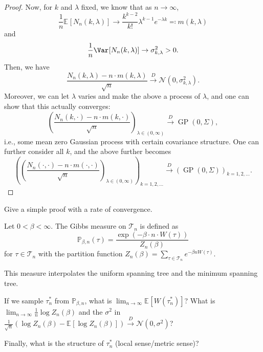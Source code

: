 \begin{proof}
	Now, for \(k\) and \(\lambda \) fixed, we know that as \(n \to \infty \),
	\[
		\frac{1}{n}\mathbb{E}_{}[N_n(k, \lambda )]
		\to \frac{k^{k-2}}{k!} \lambda ^{k-1} e^{-\lambda k}
		\eqqcolon m(k, \lambda )
	\]
	and
	\[
		\frac{1}{n} \Var_{}[N_n(k, \lambda )]
		\to \sigma _{k, \lambda }^2
		> 0.
	\]
	Then, we have
	\[
		\frac{N_n(k, \lambda ) - n \cdot m(k, \lambda )}{\sqrt{n} }
		\overset{D}{\to} \mathcal{N} (0, \sigma _{k, \lambda }^2).
	\]
	Moreover, we can let \(\lambda \) varies and make the above a process of \(\lambda \), and one can show that this actually converges:
	\[
		\left( \frac{N_n(k, \cdot ) - n \cdot m(k, \cdot )}{\sqrt{n} } \right) _{\lambda \in (0, \infty )}
		\overset{D}{\to} \operatorname{GP}(0, \Sigma ),
	\]
	i.e., some mean zero Gaussian process with certain covariance structure. One can further consider all \(k\), and the above further becomes
	\[
		\left( \left( \frac{N_n(\cdot , \cdot ) - n \cdot m(\cdot, \cdot )}{\sqrt{n} } \right) _{\lambda \in (0, \infty )} \right) _{k = 1, 2, \dots }
		\overset{D}{\to} \left( \operatorname{GP}(0, \Sigma ) \right) _{k = 1, 2, \dots }.
	\]
\end{proof}

\begin{exercise}
	Give a simple proof with a rate of convergence.
\end{exercise}

\begin{problem*}
	Let \(0 < \beta < \infty \). The Gibbs measure on \(\mathcal{T} _n\) is defined as
	\[
		\mathbb{P} _{\beta , n}(\tau )
		= \frac{\exp (-\beta \cdot n \cdot W(\tau ))}{Z_n(\beta )}
	\]
	for \(\tau \in \mathcal{T} _n\) with the partition function \(Z_n(\beta ) = \sum_{\tau \in \mathcal{T} _n} e^{-\beta n W(\tau )}\).

	\begin{intuition}
		This measure interpolates the uniform spanning tree and the minimum spanning tree.
	\end{intuition}

	If we sample \(\tau _n^{\ast} \) from \(\mathbb{P} _{\beta , n}\), what is \(\lim_{n \to \infty} \mathbb{E}_{}[W(\tau _n^{\ast} )] \)? What is \(\lim_{n \to \infty} \frac{1}{n} \log Z_n(\beta )\) and the \(\sigma ^2\) in \(\frac{1}{\sqrt{n} } (\log Z_n(\beta ) - \mathbb{E}_{}[\log Z_n(\beta )] ) \overset{D}{\to} \mathcal{N} (0, \sigma ^2)\)?

	Finally, what is the structure of \(\tau _n^{\ast} \) (local sense/metric sense)?
\end{problem*}

